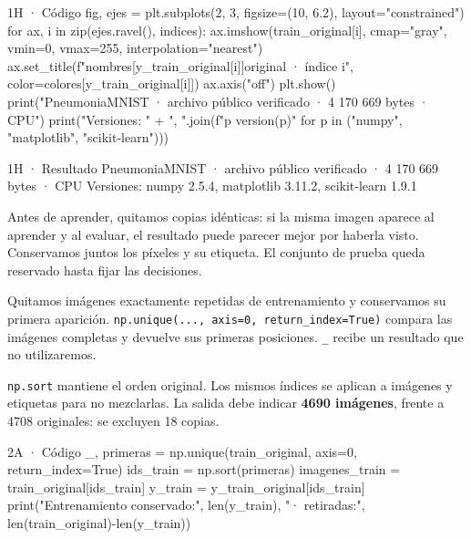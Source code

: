\begin{Codigo}{1H · Código}
fig, ejes = plt.subplots(2, 3, figsize=(10, 6.2), layout="constrained")
for ax, i in zip(ejes.ravel(), indices):
    ax.imshow(train_original[i], cmap="gray", vmin=0, vmax=255, interpolation="nearest")
    ax.set_title(f"{nombres[y_train_original[i]]}\nTrain original · índice {i}", color=colores[y_train_original[i]])
    ax.axis("off")
plt.show()
print("PneumoniaMNIST · archivo público verificado · 4 170 669 bytes · CPU")
print("Versiones: " + ", ".join(f"{p} {version(p)}" for p in ("numpy", "matplotlib", "scikit-learn")))
\end{Codigo}


\begin{Salida}{1H · Resultado}
PneumoniaMNIST · archivo público verificado · 4 170 669 bytes · CPU
Versiones: numpy 2.5.4, matplotlib 3.11.2, scikit-learn 1.9.1
\end{Salida}

\label{bloque-2}

Antes de aprender, quitamos copias idénticas: si la misma imagen aparece al aprender y al evaluar, el resultado puede parecer mejor por haberla visto. Conservamos juntos los píxeles y su etiqueta. El conjunto de prueba queda reservado hasta fijar las decisiones.


\label{paso-2a}

Quitamos imágenes exactamente repetidas de entrenamiento y conservamos su primera aparición. \texttt{\small np.\allowbreak{}unique(\allowbreak{}.\allowbreak{}.\allowbreak{}.\allowbreak{},\allowbreak{} axis=\allowbreak{}0,\allowbreak{} return\_\allowbreak{}index=\allowbreak{}True)\allowbreak{}} compara las imágenes completas y devuelve sus primeras posiciones. \texttt{\small \_\allowbreak{}} recibe un resultado que no utilizaremos.

\texttt{\small np.\allowbreak{}sort} mantiene el orden original. Los mismos índices se aplican a imágenes y etiquetas para no mezclarlas. La salida debe indicar \textbf{4690 imágenes}, frente a 4708 originales: se excluyen 18 copias.


\begin{Codigo}{2A · Código}
_, primeras = np.unique(train_original, axis=0, return_index=True)
ids_train = np.sort(primeras)
imagenes_train = train_original[ids_train]
y_train = y_train_original[ids_train]
print("Entrenamiento conservado:", len(y_train), "· retiradas:", len(train_original)-len(y_train))
\end{Codigo}

